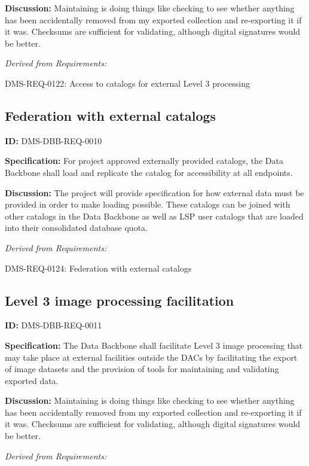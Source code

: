 \documentclass[SE,toc]{lsstdoc}
\begin{document}
\textbf{Discussion:}
Maintaining is doing things like checking to see whether anything has been accidentally removed from my exported collection and re-exporting it if it was.  Checksums are sufficient for validating, although digital signatures would be better.

\emph{Derived from Requirements:}

DMS-REQ-0122:
Access to catalogs for external Level 3 processing \newline

\subsection{Federation with external catalogs}

\label{DMS-DBB-REQ-0010}
\textbf{ID:} DMS-DBB-REQ-0010

\textbf{Specification:}
For project approved externally provided catalogs, the Data Backbone shall load and replicate the catalog for accessibility at all endpoints.

\textbf{Discussion:}
The project will provide specification for how external data must be provided in order to make loading possible.    These catalogs can be joined with other catalogs in the Data Backbone as well as LSP user catalogs that are loaded into their consolidated database quota.

\emph{Derived from Requirements:}

DMS-REQ-0124:
Federation with external catalogs \newline

\subsection{Level 3 image processing facilitation}

\label{DMS-DBB-REQ-0011}
\textbf{ID:} DMS-DBB-REQ-0011

\textbf{Specification:}
The Data Backbone shall facilitate Level 3 image processing that may take place at external
 facilities outside the DACs by facilitating the export of image
 datasets and the provision of tools for maintaining and validating exported data.

\textbf{Discussion:}
Maintaining is doing things like checking to see whether anything has been accidentally removed from my exported collection and re-exporting it if it was.  Checksums are sufficient for validating, although digital signatures would be better.

\emph{Derived from Requirements:}
\end{document}

